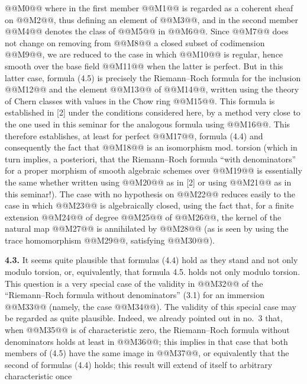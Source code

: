@@M0@@
where in the first member @@M1@@ is regarded as a coherent sheaf on @@M2@@, thus defining an element of @@M3@@, and in the second member @@M4@@ denotes the class of @@M5@@ in @@M6@@. Since @@M7@@ does not change on removing from @@M8@@ a closed subset of codimension @@M9@@, we are reduced to the case in which @@M10@@ is regular, hence smooth over the base field @@M11@@ when the latter is perfect. But in this latter case, formula (4.5) is precisely the Riemann--Roch formula for the inclusion @@M12@@ and the element @@M13@@ of @@M14@@, written using the theory of Chern classes with values in the Chow ring @@M15@@. This formula is established in [2] under the conditions considered here, by a method very close to the one used in this seminar for the analogous formula using @@M16@@. This therefore establishes, at least for perfect @@M17@@, formula (4.4) and consequently the fact that @@M18@@ is an isomorphism mod. torsion (which in turn implies, a posteriori, that the Riemann--Roch formula ``with denominators'' for a proper morphism of smooth algebraic schemes over @@M19@@ is essentially the same whether written using @@M20@@ as in [2] or using @@M21@@ as in this seminar!). The case with no hypothesis on @@M22@@ reduces easily to the case in which @@M23@@ is algebraically closed, using the fact that, for a finite extension @@M24@@ of degree @@M25@@ of @@M26@@, the kernel of the natural map @@M27@@ is annihilated by @@M28@@ (as is seen by using the trace homomorphism @@M29@@, satisfying @@M30@@).

\textbf{4.3.} It seems quite plausible that formulas (4.4) hold as they stand and not only modulo torsion, or, equivalently, that formula 4.5. holds not only modulo torsion. This question is a very special case of the validity in @@M32@@ of the ``Riemann--Roch formula without denominators'' (3.1) for an immersion @@M33@@ (namely, the case @@M34@@). The validity of this special case may be regarded as quite plausible. Indeed, we already pointed out in no.~3 that, when @@M35@@ is of characteristic zero, the Riemann--Roch formula without denominators holds at least in @@M36@@; this implies in that case that both members of (4.5) have the same image in @@M37@@, or equivalently that the second of formulas (4.4) holds; this result will extend of itself to arbitrary characteristic once
